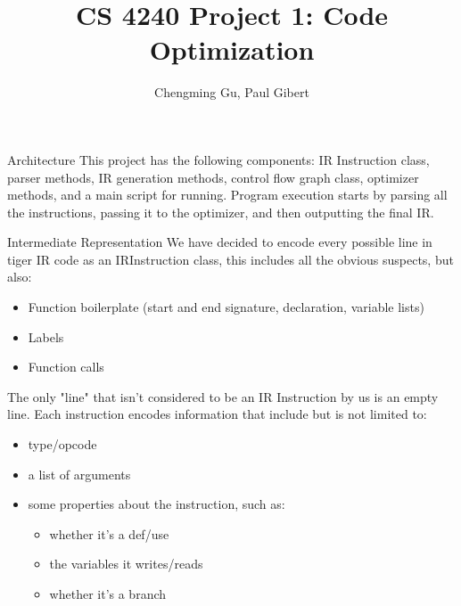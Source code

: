 \documentclass[letterpaper,12pt]{article}
\theoremstyle{definition}
\begin{document}
	\title{CS 4240 Project 1: Code Optimization}
	\author{Chengming Gu, Paul Gibert}
	\maketitle

	\begin{section}{Architecture}
		This project has the following components: IR Instruction class, parser methods, IR generation methods, control flow graph class, optimizer methods, and a main script for running. Program execution starts by parsing all the instructions, passing it to the optimizer, and then outputting the final IR.
		\begin{subsection}{Intermediate Representation}
			We have decided to encode every possible line in tiger IR code as an IRInstruction class, this includes all the obvious suspects, but also:
			\begin{itemize}
				\item Function boilerplate (start and end signature, declaration, variable lists)
				\item Labels
				\item Function calls
			\end{itemize}
			The only "line" that isn't considered to be an IR Instruction by us is an empty line. Each instruction encodes information that include but is not limited to:
			\begin{itemize}
				\item type/opcode
				\item a list of arguments
				\item some properties about the instruction, such as:
					\begin{itemize}
						\item whether it's a def/use
						\item the variables it writes/reads
						\item whether it's a branch
					\end{itemize}
			\end{itemize}
		\end{subsection}


\end{section}
\end{document}
